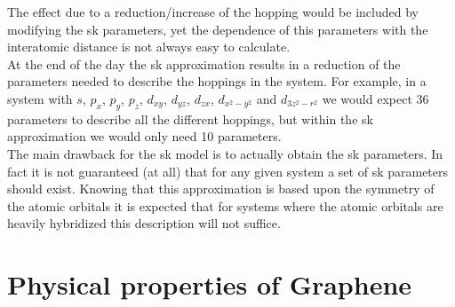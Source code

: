 The effect due to a reduction/increase of the hopping would be included by modifying the \ac{sk} parameters, yet the dependence of this parameters with the interatomic distance is not always easy to calculate.\\

At the end of the day the \ac{sk} approximation results in a reduction of the parameters needed to describe the hoppings in the system. For example, in a system with $s$, $p_x$, $p_y$, $p_z$, $d_{xy}$, $d_{yz}$, $d_{zx}$, $d_{x^{2}-y^{2}}$ and $d_{3z^{2}-r^{2}}$ we would expect 36 parameters to describe all the different hoppings, but within the \ac{sk} approximation we would only need 10 parameters.\\


The main drawback for the \ac{sk} model is to actually obtain the \ac{sk} parameters. In fact it is not guaranteed (at all) that for any given system a set of \ac{sk} parameters should exist.
Knowing that this approximation is based upon the symmetry of the atomic orbitals it is expected that for systems where the atomic orbitals are heavily hybridized this description will not suffice.




\section{Physical properties of Graphene}
